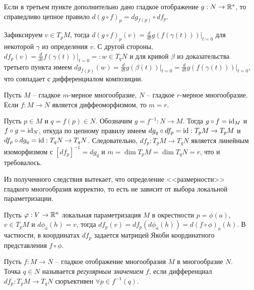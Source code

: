 \begin{corollary}
	Если в третьем пункте дополнительно дано гладкое отображение $g : N \to \mathbb{R}^s$, то справедливо цепное правило 
	$d(g \circ f)_p = dg_{f(p)} \circ df_p$.
\end{corollary}

\begin{myproof}
	Зафиксируем $v \in T_p M$, тогда $d(g \circ f)_p (v) = \frac{d}{dt} g(f(\gamma(t))) \big|_{t=0}$ для некоторой $\gamma$ из определения $v$.
	С другой стороны, $df_p(v) = \frac{d}{dt} f(\gamma(t)) \big|_{t=0} =: w \in T_q N$ и для кривой $\beta$ из доказательства третьего пункта имеем $d g_{f(p)} (w) = \frac{d}{dt} g(\beta(t)) \big|_{t=0} = \frac{d}{dt} g(f(\gamma(t))) \big|_{t=0}$, что совпадает с дифференциалом композиции.
\end{myproof}

\begin{corollary}
	Пусть $M$ -- гладкое $m$-мерное многообразие, $N$ -- гладкое $r$-мерное многообразие. 
	Если $f : M \to N$ является диффеоморфизмом, то $m = r$.
\end{corollary}

\begin{myproof}
	Пусть $p \in M$ и $q = f(p) \in N$. 
	Обозначим $g = f^{-1} : N \to M$. 
	Тогда $g \circ f = \mathrm{id}_M$ и $f \circ g = \mathrm{id}_N$, откуда по цепному правилу имеем
	$dg_q \circ df_p = \mathrm{id} : T_p M \to T_p M$ и $df_p \circ dg_q = \mathrm{id} : T_q N \to T_q N$.
	Следовательно, $df_p : T_p M \to T_q N$ является линейным изоморфизмом с $[df_p]^{-1} = dg_q$ и $m = \dim T_p M = \dim T_q N = r$, что и требовалось.
\end{myproof}

\begin{note}
	Из полученного следствия вытекает, что определение <<размерности>> гладкого многообразия корректно, то есть не зависит от выбора локальной параметризации.
\end{note}

\begin{note}
	Пусть $\varphi : V \to \mathbb{R}^n$ локальная параметризация $M$ в окрестности $p = \phi(a)$, $v \in T_p M$ и $d \phi_a (h) = v$, тогда 
	$df_p (v) = df_p (d \phi_a (h)) = d (f \circ \phi)_a (h)$. В частности, 
	в координатах $df_p$ задается матрицей Якоби координатного представления $f \circ \phi$. 
\end{note}

\begin{definition}
	Пусть $f : M \to N$ -- гладкое отображение многообразия $M$ в многообразие $N$.
	Точка $q \in N$ называется \textit{регулярным значением} $f$, если дифференциал $df_p : T_p M \to T_q N$ сюръективен $\forall p \in f^{-1}(q)$.
\end{definition}

